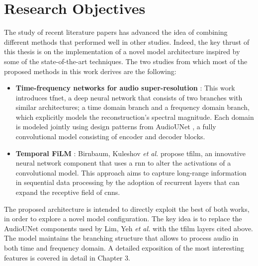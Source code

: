 \section{Research Objectives}
The study of recent literature papers has advanced the idea of combining different methods that performed well in other studies. Indeed, the key thrust of this thesis is on the implementation of a novel model architecture inspired by some of the state-of-the-art techniques. The two studies from which most of the proposed methods in this work derives are the following:
\begin{itemize}
	\item \textbf{Time-frequency networks for audio super-resolution} \cite{lim2018time}: This work introduces \gls{tfnet}, a deep neural network that consists of two branches with similar architectures; a time domain branch and a frequency domain branch, which explicitly models the reconstruction’s spectral magnitude. Each domain is modeled jointly using design patterns from AudioUNet \cite{kuleshov2017audio}, a fully convolutional model consisting of encoder and decoder blocks.
	\item \textbf{Temporal FiLM} \cite{birnbaum2019temporal}:  Birnbaum, Kuleshov \textit{et al.} propose \gls{tfilm}, an innovative neural network component that uses a \gls{rnn} to alter the activations of a convolutional model. This approach aims to capture long-range information in sequential data processing by the adoption of recurrent layers that can expand the receptive field of \gls{cnn}s.
\end{itemize}
The proposed architecture is intended to directly exploit the best of both works, in order to explore a novel model configuration. The key idea is to replace the AudioUNet components used by Lim, Yeh \textit{et al.} with the \gls{tfilm} layers cited above. The model maintains the branching structure that allows to process audio in both time and frequency domain. A detailed exposition of the most interesting features is covered in detail in Chapter 3.

